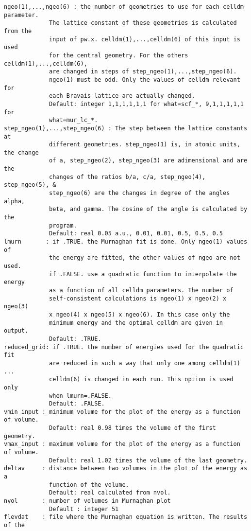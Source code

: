 \documentclass[12pt,a4paper]{article}
\begin{document}
\begin{verbatim}
ngeo(1),...,ngeo(6) : the number of geometries to use for each celldm parameter.
             The lattice constant of these geometries is calculated from the
             input of pw.x. celldm(1),...,celldm(6) of this input is used 
             for the central geometry. For the others celldm(1),...,celldm(6),
             are changed in steps of step_ngeo(1),...,step_ngeo(6). 
             ngeo(1) must be odd. Only the values of celldm relevant for
             each Bravais lattice are actually changed.
             Default: integer 1,1,1,1,1,1 for what=scf_*, 9,1,1,1,1,1 for 
             what=mur_lc_*.
step_ngeo(1),...,step_ngeo(6) : The step between the lattice constants at 
             different geometries. step_ngeo(1) is, in atomic units, the change
             of a, step_ngeo(2), step_ngeo(3) are adimensional and are the
             changes of the ratios b/a, c/a, step_ngeo(4), step_ngeo(5), &
             step_ngeo(6) are the changes in degree of the angles alpha,
             beta, and gamma. The cosine of the angle is calculated by the
             program.
             Default: real 0.05 a.u., 0.01, 0.01, 0.5, 0.5, 0.5
lmurn       : if .TRUE. the Murnaghan fit is done. Only ngeo(1) values of
             the energy are fitted, the other values of ngeo are not used. 
             if .FALSE. use a quadratic function to interpolate the energy 
             as a function of all celldm parameters. The number of 
             self-consistent calculations is ngeo(1) x ngeo(2) x ngeo(3)
             x ngeo(4) x ngeo(5) x ngeo(6). In this case only the 
             minimum energy and the optimal celldm are given in output. 
             Default: .TRUE. 
reduced_grid: if .TRUE. the number of energies used for the quadratic fit 
             are reduced in such a way that only one among celldm(1) ... 
             celldm(6) is changed in each run. This option is used only 
             when lmurn=.FALSE.
             Default: .FALSE.
vmin_input : minimum volume for the plot of the energy as a function of volume.
             Default: real 0.98 times the volume of the first geometry.
vmax_input : maximum volume for the plot of the energy as a function of volume.
             Default: real 1.02 times the volume of the last geometry.
deltav     : distance between two volumes in the plot of the energy as a 
             function of the volume.
             Default: real calculated from nvol.
nvol       : number of volumes in Murnaghan plot
             Default : integer 51
flevdat    : file where the Murnaghan equation is written. The results of the

\end{verbatim}
\end{document}
